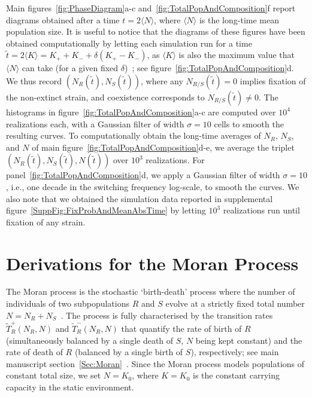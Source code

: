 \documentclass{article}
\begin{document}
Main figures~\ref{fig:PhaseDiagram}a-c and~\ref{fig:TotalPopAndComposition}f report diagrams obtained after a time $t=2\langle N\rangle$, where $\langle N\rangle$ is the long-time mean population size. It is useful to notice that the diagrams of these figures have been obtained computationally by letting each simulation run for a time \(\widetilde{t}=2\langle K\rangle=K_++K_- +\delta(K_+-K_-)\), as \(\langle K\rangle\) is also the maximum value that $\langle N \rangle$ can take (for a given fixed $\delta$)~\cite{wienand2017evolution,wienand2018eco,taitelbaum2020population}; see figure~\ref{fig:TotalPopAndComposition}d. We thus record $(N_R(\widetilde{t}), N_S(\widetilde{t}))$, where any \(N_{R/S}(\widetilde{t})=0\) implies fixation of the non-extinct strain, and coexistence corresponds to \(N_{R/S}(\widetilde{t})\neq0\). The histograms in figure~\ref{fig:TotalPopAndComposition}a-c are computed over \(10^{4}\) realizations each, with a Gaussian filter of width \(\sigma=10\) cells to smooth the resulting curves. To computationally obtain the long-time averages of \(N_R\), \(N_S\), and \(N\) of main figure~\ref{fig:TotalPopAndComposition}d-e, we average the triplet $(N_R(\widetilde{t}), N_S(\widetilde{t}), N(\widetilde{t}))$ over \(10^3\) realizations. For panel~\ref{fig:TotalPopAndComposition}d, we apply a Gaussian filter of width \(\sigma=10\), i.e., one decade in the switching frequency log-scale, to smooth the curves. We also note that we obtained the simulation data reported in supplemental figure~\ref{SuppFig:FixProbAndMeanAbsTime} by letting \(10^3\) realizations run until fixation of any strain.


\section{Derivations for the Moran Process}

The Moran process is the stochastic `birth-death' process where the number of individuals of two subpopulations \(R\) and \(S\) evolve at a strictly fixed total number \(N=N_{R}+N_{S}\)~\cite{Moran, Ewens, Blythe07, antal2006fixation, traulsen2009stochastic, wienand2017evolution, wienand2018eco, Cremer11}. The process is fully characterised by the transition rates \(\widetilde{T}^+_R\left(N_R,N\right)\) and \(\widetilde{T}^-_R\left(N_R,N\right)\) that quantify the rate of birth of \(R\) (simultaneously balanced by a single death of \(S\), \(N\) being kept constant) and the rate of death of \(R\) (balanced by a single birth of \(S\)), respectively; see main manuscript section~\ref{Sec:Moran}~\cite{wienand2017evolution, wienand2018eco}. Since the Moran process models populations of constant total size, we set \(N=K_0\), where \(K=K_0\) is the constant carrying capacity in the static environment.
\end{document}
